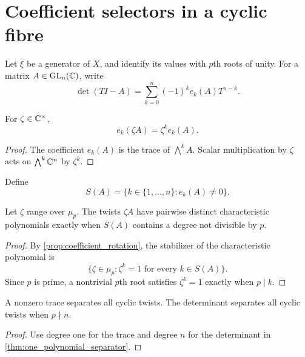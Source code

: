 \section{Coefficient selectors in a cyclic fibre}\label{sec:selectors}

Let \(\xi\) be a generator of \(X\), and identify its values with \(p\)th roots of unity. For a matrix \(A\in\operatorname{GL}_n(\mathbb C)\), write
\[
 \det(TI-A)
 =
 \sum_{k=0}^{n}(-1)^k e_k(A)T^{n-k}.
\]

\begin{proposition}\label{prop:coefficient_rotation}
For \(\zeta\in\mathbb C^\times\),
\[
 \boxed{
 e_k(\zeta A)=\zeta^k e_k(A).
 }
\]
\end{proposition}

\begin{proof}
The coefficient \(e_k(A)\) is the trace of \(\bigwedge^k A\). Scalar multiplication by \(\zeta\) acts on \(\bigwedge^k\mathbb C^n\) by \(\zeta^k\).
\end{proof}

\begin{definition}\label{def:active_degrees}
Define
\[
 S(A)=\{k\in\{1,\ldots,n\}:e_k(A)\neq0\}.
\]
\end{definition}

\begin{theorem}\label{thm:one_polynomial_separator}
Let \(\zeta\) range over \(\mu_p\). The twists \(\zeta A\) have pairwise distinct characteristic polynomials exactly when \(S(A)\) contains a degree not divisible by \(p\).
\end{theorem}

\begin{proof}
By \cref{prop:coefficient_rotation}, the stabilizer of the characteristic polynomial is
\[
 \{\zeta\in\mu_p:\zeta^k=1\text{ for every }k\in S(A)\}.
\]
Since \(p\) is prime, a nontrivial \(p\)th root satisfies \(\zeta^k=1\) exactly when \(p\mid k\).
\end{proof}

\begin{corollary}\label{cor:trace_det_selector}
A nonzero trace separates all cyclic twists. The determinant separates all cyclic twists when \(p\nmid n\).
\end{corollary}

\begin{proof}
Use degree one for the trace and degree \(n\) for the determinant in \cref{thm:one_polynomial_separator}.
\end{proof}

